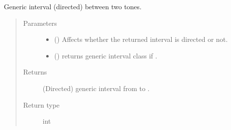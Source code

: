 \documentclass[letterpaper,10pt,english]{sphinxmanual}
\begin{document}
\begin{fulllineitems}
\begin{fulllineitems}
\begin{sphinxVerbatim}[commandchars=\\\{\}]
   
   
  
\end{sphinxVerbatim}

\end{fulllineitems}



\begin{fulllineitems}
\sphinxAtStartPar
Generic interval (directed) between two tones.
\begin{quote}\begin{description}
\item[{Parameters}] \leavevmode\begin{itemize}
\item {} 
\sphinxAtStartPar
{} () \textendash{} Affects whether the returned interval is directed or not.

\item {} 
\sphinxAtStartPar
{} () \textendash{} returns generic interval class if .

\end{itemize}

\item[{Returns}] \leavevmode
\sphinxAtStartPar
(Directed) generic interval from  to .

\item[{Return type}] \leavevmode
\sphinxAtStartPar
int


\end{description}
\end{quote}
\end{fulllineitems}
\end{fulllineitems}
\end{document}
